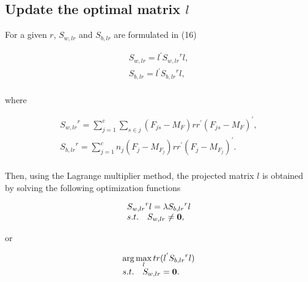 \documentclass[journal]{IEEEtran}
\begin{document}
\subsection{Update the optimal matrix $l$}
For a given $r$, $S_{w, lr}$ and $S_{b, lr}$ are formulated in (16)
\begin{small}
\begin{equation}
\begin{array}{l}
 {S_{w, lr}} = {l^{'}}{S_{w, lr}}^rl, \\
 {S_{b, lr}} = {l^{'}}{S_{b, lr}}^rl, \\
 \end{array}
\end{equation}
\end{small}
where
\begin{small}
\begin{equation}
\begin{array}{l}
 {S_{w, lr}}^r = \sum\limits_{j = 1}^c {\sum\limits_{s \in j} {({F_{js}} - {M_F})r{r^{'}}{{({F_{js}} - {M_F})}^{'}}} },  \\
 {S_{b, lr}}^r = \sum\limits_{j = 1}^c {{n_j}({F_j} - {M_{{F_j}}})r{r^{'}}{{({F_j} - {M_{{F_j}}})}^{'}}}.  \\
 \end{array}
\end{equation}
\end{small}
Then, using the Lagrange multiplier method, the projected matrix $l$ is obtained by solving the following optimization functions
\begin{small}
\begin{equation}
\begin{array}{l}
{S_{w,lr}}^rl = \lambda {S_{b,lr}}^rl\\
s.t.\quad{\rm{ }}{S_{w,lr}} \ne {\bf{0}}, \\
\end{array}
\end{equation}
\end{small}
or
\begin{small}
\begin{equation}
\begin{array}{l}
\arg \mathop {\max }\limits_l tr({l^{'}}{S_{b,lr}}^rl)\\
s.t.\quad{\rm{ }}{S_{w,lr}} = {\bf{0}}. \\
\end{array}
\end{equation}
\end{small}
\end{document}
